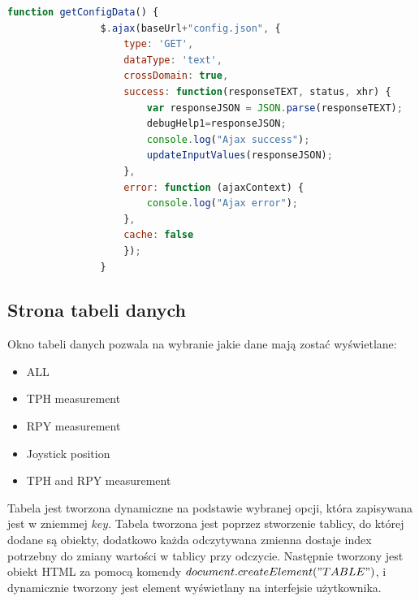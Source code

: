 \documentclass{article}
\begin{document}
				\begin{lstlisting}[caption={Kod config.js}, language=JavaScript, firstnumber=58]
				function getConfigData() {
				$.ajax(baseUrl+"config.json", {
					type: 'GET', 
					dataType: 'text',
					crossDomain: true,
					success: function(responseTEXT, status, xhr) {
						var responseJSON = JSON.parse(responseTEXT);
						debugHelp1=responseJSON;
						console.log("Ajax success");
						updateInputValues(responseJSON);
					},
					error: function (ajaxContext) {
						console.log("Ajax error");
					},
					cache: false
					});
				}
				\end{lstlisting}
			\newpage
			\subsection{Strona tabeli danych}
				Okno tabeli danych pozwala na wybranie jakie dane mają zostać wyświetlane:
				\begin{itemize}
					\item ALL
					\item TPH measurement
					\item RPY measurement
					\item Joystick position
					\item TPH and RPY measurement
				\end{itemize}
				Tabela jest tworzona dynamiczne na podstawie wybranej opcji, która zapisywana jest w zniemmej $key$.
				Tabela tworzona jest poprzez stworzenie tablicy, do której dodane są obiekty, dodatkowo każda odczytywana zmienna dostaje index potrzebny do zmiany wartości w tablicy przy odczycie. Następnie tworzony jest obiekt HTML za pomocą komendy $document.createElement("TABLE")$, i dynamicznie tworzony jest element wyświetlany na interfejsie użytkownika.
\end{document}
